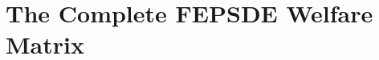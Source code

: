 \chapter{The Complete FEPSDE Welfare Matrix}
\label{app:fepsde-matrix}

\begin{abstract}
This appendix provides the complete reference documentation for the EBF 
utility framework: the Meta-Axiom U-M0 defining the universal structure, 
the 144-component decomposition, the axiom systems for INU/KNU/IDN, and 
the context-welfare interaction via the $\Gamma$-matrix.
\end{abstract}


